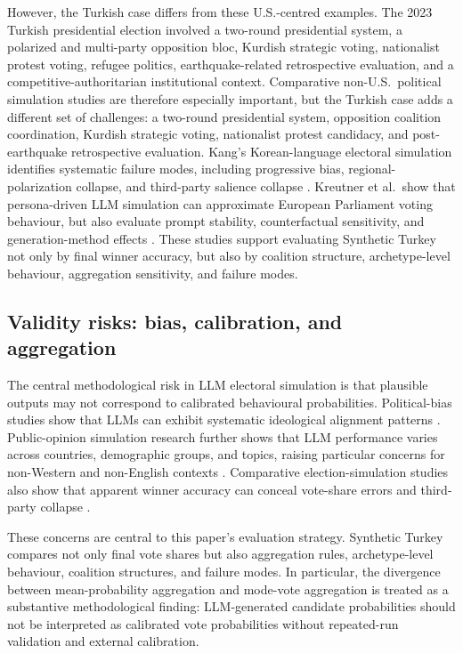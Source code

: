 \documentclass[pdflatex,sn-mathphys-num,iicol]{sn-jnl}
\begin{document}
However, the Turkish case differs from these U.S.-centred examples. The 2023
Turkish presidential election involved a two-round presidential system, a
polarized and multi-party opposition bloc, Kurdish strategic voting, nationalist
protest voting, refugee politics, earthquake-related retrospective evaluation,
and a competitive-authoritarian institutional context. Comparative non-U.S.\
political simulation studies are therefore especially important, but the Turkish
case adds a different set of challenges: a two-round presidential system,
opposition coalition coordination, Kurdish strategic voting, nationalist protest
candidacy, and post-earthquake retrospective evaluation. Kang's Korean-language
electoral simulation identifies systematic failure modes, including progressive
bias, regional-polarization collapse, and third-party salience collapse
\cite{kang2026dynamok}. Kreutner et al.\ show that persona-driven LLM simulation
can approximate European Parliament voting behaviour, but also evaluate prompt
stability, counterfactual sensitivity, and generation-method effects
\cite{kreutner2026ep}. These studies support evaluating Synthetic Turkey not
only by final winner accuracy, but also by coalition structure, archetype-level
behaviour, aggregation sensitivity, and failure modes.

\subsection{Validity risks: bias, calibration, and
aggregation}\label{subsec:validity-risks}

The central methodological risk in LLM electoral simulation is that plausible
outputs may not correspond to calibrated behavioural probabilities.
Political-bias studies show that LLMs can exhibit systematic ideological
alignment patterns \cite{rettenberger2025politicalbias}. Public-opinion
simulation research further shows that LLM performance varies across countries,
demographic groups, and topics, raising particular concerns for non-Western and
non-English contexts \cite{qu2024performance}. Comparative election-simulation
studies also show that apparent winner accuracy can conceal vote-share errors
and third-party collapse \cite{kang2026dynamok}.

These concerns are central to this paper's evaluation strategy. Synthetic
Turkey compares not only final vote shares but also aggregation rules,
archetype-level behaviour, coalition structures, and failure modes. In
particular, the divergence between mean-probability aggregation and mode-vote
aggregation is treated as a substantive methodological finding: LLM-generated
candidate probabilities should not be interpreted as calibrated vote
probabilities without repeated-run validation and external calibration.
\end{document}
